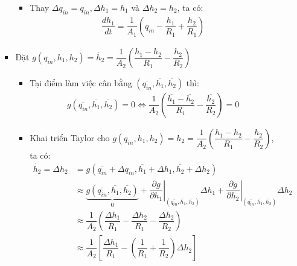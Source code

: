 \begin{enumerate}[\it a.]
\begin{itemize}
\begin{itemize}
\begin{itemize}
                                \item Thay $\Delta q_{in} = q_{in}, \Delta h_1 = h_1$ và $\Delta h_2 = h_2$, ta có:
                                    \begin{align}
                                        \dfrac{dh_1}{dt} = \dfrac{1}{A_1} \left({q_{in} - \dfrac{h_1}{R_1} + \dfrac{h_2}{R_1}}\right)
                                    \end{align}
                            \end{itemize}

                        \item Đặt $g\left({q_{in}, h_1, h_2}\right) = \dot{h_2} = \dfrac{1}{A_2} \left({\dfrac{h_1 - h_2}{R_1} - \dfrac{h_2}{R_2}}\right)$
                            \begin{itemize}
                                \item Tại điểm làm việc cân bằng $\left({\overline{q_{in}}, \overline{h_1}, \overline{h_2}}\right)$ thì:
                                    \begin{align}
                                        g\left({\overline{q_{in}}, \overline{h_1}, \overline{h_2}}\right) = 0 \Longleftrightarrow \dfrac{1}{A_2} \left({\dfrac{\overline{h_1} - \overline{h_2}}{R_1} - \dfrac{\overline{h_2}}{R_2}}\right) = 0
                                    \end{align}

                                \item Khai triển Taylor cho $g\left({q_{in}, h_1, h_2}\right) = \dot{h_2} = \dfrac{1}{A_2} \left({\dfrac{h_1 - h_2}{R_1} - \dfrac{h_2}{R_2}}\right)$, ta có:
                                    \begin{align}
                                        \dot{h_2} = \Delta h_2 & = g\left({\overline{q_{in}} + \Delta q_{in}, \overline{h_1} + \Delta h_1, \overline{h_2} + \Delta h_2}\right) \\
                                        & \approx \underbrace{g\left({\overline{q_{in}}, \overline{h_1}, \overline{h_2}}\right)}_{0} + \left.\dfrac{\partial g}{\partial h_1}\right|_{\left({\overline{q_{in}}, \overline{h_1}, \overline{h_2}}\right)} \Delta h_1 + \left.\dfrac{\partial g}{\partial h_2}\right|_{\left({\overline{q_{in}}, \overline{h_1}, \overline{h_2}}\right)} \Delta h_2\\
                                        & \approx \dfrac{1}{A_2} \left({\dfrac{\Delta h_1}{R_1} - \dfrac{\Delta h_2}{R_1} - \dfrac{\Delta h_2}{R_2}}\right)\\
                                        & \approx \dfrac{1}{A_2} \left[{\dfrac{\Delta h_1}{R_1} - \left({\dfrac{1}{R_1} + \dfrac{1}{R_2}}\right) \Delta h_2}\right]
                                    \end{align}


\end{itemize}
\end{itemize}
\end{itemize}
\end{enumerate}
